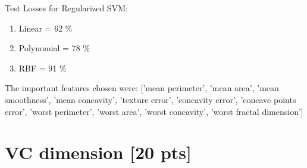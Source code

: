 \documentclass[a4paper]{article}
\theoremstyle{definition}
\newenvironment{soln}{
    \leavevmode\color{blue}\ignorespaces
}{}
\begin{document}
\begin{itemize}
    \begin{soln}
        Test Losses for Regularized SVM:
        \begin{enumerate}
            \item Linear = 62 \%
            \item Polynomial = 78 \%
            \item RBF = 91 \%
        \end{enumerate}
        The important features chosen were: ['mean perimeter', 'mean area', 'mean smoothness', 'mean concavity', 'texture error', 'concavity error', 'concave points error', 'worst perimeter', 'worst area', 'worst concavity', 'worst fractal dimension']
    \end{soln}
\end{itemize}

\section{VC dimension [20 pts]}
\end{document}
